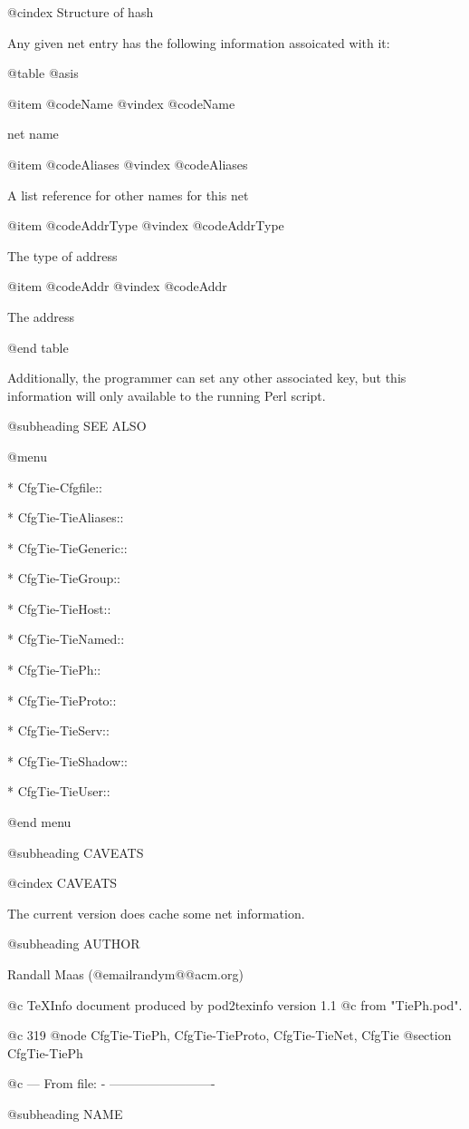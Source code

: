 {{{{{{{{{{{{{{{{@cindex Structure of hash

Any given net entry has the following information assoicated with it:

@table @asis

@item @code{Name}
@vindex @code{Name}

net name

@item @code{Aliases}
@vindex @code{Aliases}

A list reference for other names for this net

@item @code{AddrType}
@vindex @code{AddrType}

The type of address

@item @code{Addr}
@vindex @code{Addr}

The address

@end table

Additionally, the programmer can set any other associated key, but this
information will only available to the running Perl script.

@subheading SEE ALSO


@menu

* CfgTie-Cfgfile::	


* CfgTie-TieAliases::	
 
* CfgTie-TieGeneric::	
 
* CfgTie-TieGroup::	


* CfgTie-TieHost::	
    
* CfgTie-TieNamed::	
   
* CfgTie-TiePh::	


* CfgTie-TieProto::	
   
* CfgTie-TieServ::	
    
* CfgTie-TieShadow::	


* CfgTie-TieUser::	


@end menu

@subheading CAVEATS

@cindex CAVEATS

The current version does cache some net information.

@subheading AUTHOR

Randall Maas (@email{randym@@acm.org})

@c TeXInfo document produced by pod2texinfo version 1.1
@c from "TiePh.pod".


@c 319
@node CfgTie-TiePh, CfgTie-TieProto, CfgTie-TieNet, CfgTie
@section CfgTie-TiePh


@c --- From file: - -------------------------

@subheading NAME


}}}}}}}}}}}}}}}}

